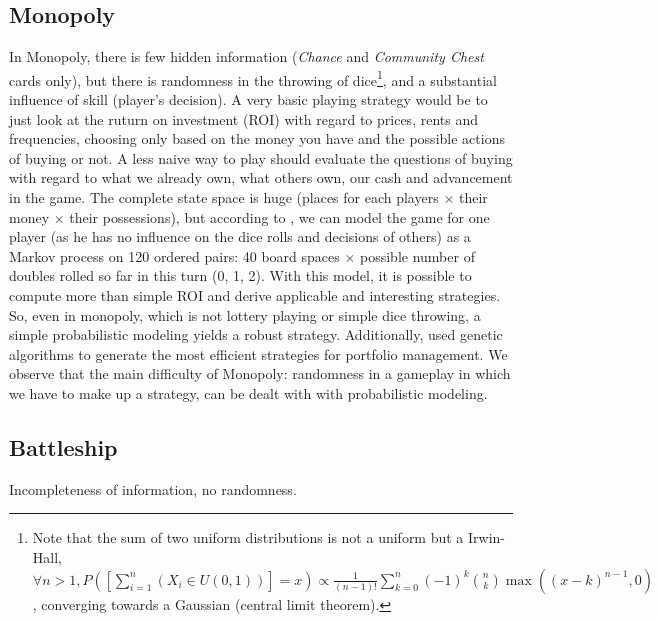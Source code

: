 \subsection{Monopoly}
In Monopoly, there is few hidden information (\textit{Chance} and \textit{Community Chest} cards only), but there is randomness in the throwing of dice\footnote{Note that the sum of two uniform distributions is not a uniform but a Irwin-Hall, $\forall n>1, P([\sum_{i=1}^n{(X_i\in U(0,1))}]=x) \propto \frac{1}{(n-1)!}\sum_{k=0}^n(-1)^k{n\choose k}\max{((x-k)^{n-1},0)}$, converging towards a Gaussian (central limit theorem).}, and a substantial influence of skill (player's decision). A very basic playing strategy would be to just look at the ruturn on investment (ROI) with regard to prices, rents and frequencies, choosing only based on the money you have and the possible actions of buying or not. A less naive way to play should evaluate the questions of buying with regard to what we already own, what others own, our cash and advancement in the game. The complete state space is huge (places for each players $\times$ their money $\times$ their possessions), but according to \cite{MonopolyMarkov}, we can model the game for one player (as he has no influence on the dice rolls and decisions of others) as a Markov process on 120 ordered pairs: 40 board spaces $\times$ possible number of doubles rolled so far in this turn (0, 1, 2). With this model, it is possible to compute more than simple ROI and derive applicable and interesting strategies. So, even in monopoly, which is not lottery playing or simple dice throwing, a simple probabilistic modeling yields a robust strategy. Additionally, \cite{MonopolyFrayn05} used genetic algorithms to generate the most efficient strategies for portfolio management. We observe that the main difficulty of Monopoly: randomness in a gameplay in which we have to make up a strategy, can be dealt with with probabilistic modeling.

\subsection{Battleship}
Incompleteness of information, no randomness.

